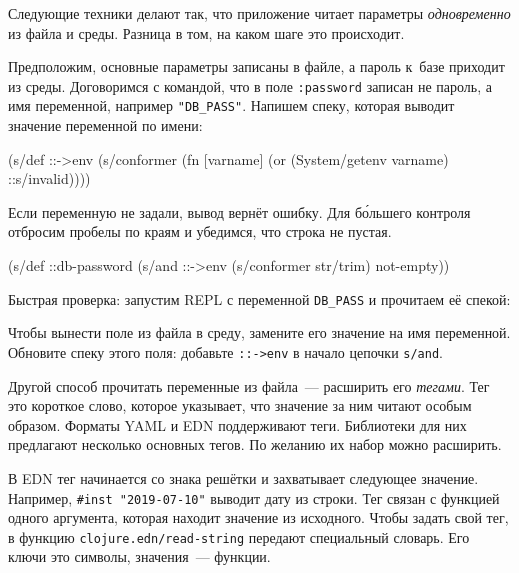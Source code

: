 Следующие техники делают так, что приложение читает параметры
\emph{одновременно} из файла и среды. Разница в том, на каком шаге это
происходит.

Предположим, основные параметры записаны в файле, а пароль к~базе приходит из
среды. Договоримся с командой, что в поле \verb|:password| записан не пароль,
а имя переменной, например \verb|"DB_PASS"|. Напишем спеку, которая выводит
значение переменной по имени:

\begin{english}
  \begin{clojure}
(s/def ::->env
  (s/conformer
   (fn [varname]
     (or (System/getenv varname) ::s/invalid))))
  \end{clojure}
\end{english}

Если переменную не задали, вывод вернёт ошибку. Для б\'{о}льшего контроля
отбросим пробелы по краям и убедимся, что строка не пустая.

\begin{english}
  \begin{clojure}
(s/def ::db-password
  (s/and ::->env
         (s/conformer str/trim)
         not-empty))
  \end{clojure}
\end{english}

Быстрая проверка: запустим REPL с переменной \verb|DB_PASS| и прочитаем её
спекой:

\begin{english}
  \begin{bash}
DB_PASS='*(&fd}A53z#$!' lein repl

(s/conform ::db-password "DB_PASS")
"*(&fd}A53z#$!"
  \end{bash}
\end{english}

Чтобы вынести поле из файла в среду, замените его значение на имя
переменной. Обновите спеку этого поля: добавьте \verb|::->env| в начало цепочки
\verb|s/and|.


Другой способ прочитать переменные из файла~--- расширить его \emph{тегами}. Тег
это короткое слово, которое указывает, что значение за ним читают особым
образом. Форматы YAML и EDN поддерживают теги. Библиотеки для них предлагают
несколько основных тегов. По желанию их набор можно расширить.


В EDN тег начинается со знака решётки и захватывает следующее
значение. Например, \verb|#inst "2019-07-10"| выводит дату из строки. Тег связан
с функцией одного аргумента, которая находит значение из исходного. Чтобы задать
свой тег, в функцию \verb|clojure.edn/read-string| передают специальный
словарь. Его ключи это символы, значения~--- функции.

